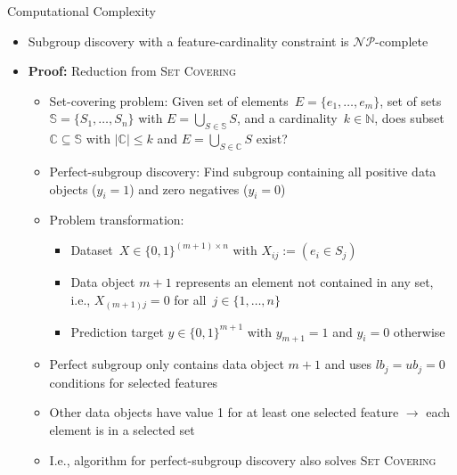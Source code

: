 \documentclass[en, navbaroff]{sdqbeamer}
\begin{document}
\begin{frame}[t]{Computational Complexity}
	\begin{itemize}
		\item Subgroup discovery with a feature-cardinality constraint is $\mathcal{NP}$-complete
		\vspace{\baselineskip}
		\item \textbf{Proof:} Reduction from \textsc{Set Covering}~\cite{karp1972reducibility}
		\begin{itemize}
			\item Set-covering problem: Given set of elements~$E = \{e_1, \dots, e_m\}$, set of sets~$\mathbb{S} = \{S_1,  \dots, S_n\}$ with $E = \bigcup_{S \in \mathbb{S}} S$, and a cardinality~$k \in \mathbb{N}$, does subset $\mathbb{C} \subseteq \mathbb{S}$ with $|\mathbb{C}| \leq k$ and $E = \bigcup_{S \in \mathbb{C}} S$ exist?
			\item Perfect-subgroup discovery: Find subgroup containing all positive data objects ($y_i = 1$) and zero negatives ($y_i = 0$)
			\item Problem transformation:
			\begin{itemize}
				\item Dataset~$X \in \{0, 1\}^{(m + 1) \times n}$ with $X_{ij} := (e_i \in S_j)$
				\item Data object $m+1$ represents an element not contained in any set, i.e., $X_{(m+1)j} = 0$ for all~$j \in \{1, \dots, n\}$
				\item Prediction target $y \in \{0, 1\}^{m+1}$ with $y_{m+1} = 1$ and $y_i = 0$ otherwise
			\end{itemize}
			\item Perfect subgroup only contains data object $m+1$ and uses $\mathit{lb}_j = \mathit{ub}_j = 0$ conditions for selected features
			\item Other data objects have value 1 for at least one selected feature $\rightarrow$ each element is in a selected set
			\item I.e., algorithm for perfect-subgroup discovery also solves \textsc{Set Covering}

\end{itemize}
\end{itemize}
\end{frame}
\end{document}
